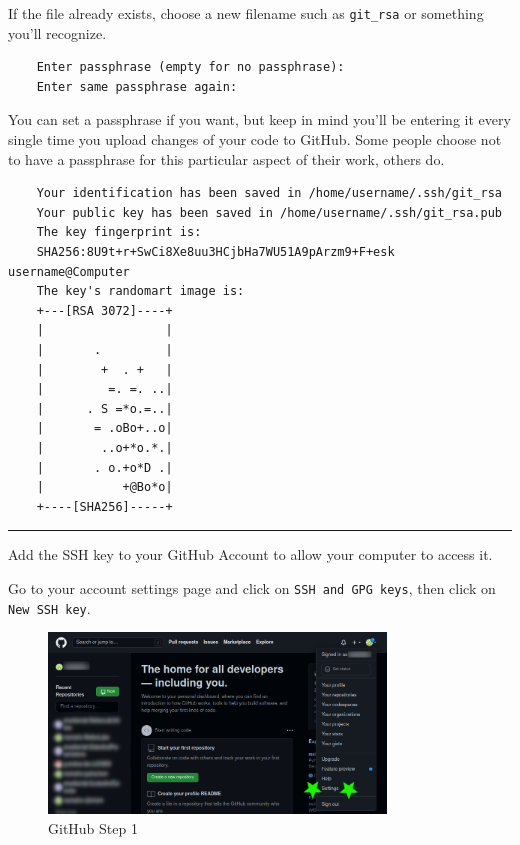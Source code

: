 If the file already exists, choose a new filename such as
\texttt{git\_rsa} or something you'll recognize.

\begin{verbatim}
    Enter passphrase (empty for no passphrase): 
    Enter same passphrase again: 
\end{verbatim}

You can set a passphrase if you want, but keep in mind you'll be
entering it every single time you upload changes of your code to GitHub.
Some people choose not to have a passphrase for this particular aspect
of their work, others do.

\begin{verbatim}
    Your identification has been saved in /home/username/.ssh/git_rsa
    Your public key has been saved in /home/username/.ssh/git_rsa.pub
    The key fingerprint is:
    SHA256:8U9t+r+SwCi8Xe8uu3HCjbHa7WU51A9pArzm9+F+esk username@Computer
    The key's randomart image is:
    +---[RSA 3072]----+
    |                 |
    |       .         |
    |        +  . +   |
    |         =. =. ..|
    |      . S =*o.=..|
    |       = .oBo+..o|
    |        ..o+*o.*.|
    |       . o.+o*D .|
    |           +@Bo*o|
    +----[SHA256]-----+
\end{verbatim}
\begin{center}\rule{0.5\linewidth}{0.5pt}\end{center}
Add the SSH key to your GitHub Account to allow your computer to access
it.

Go to your account settings page and click on
\texttt{SSH\ and\ GPG\ keys}, then click on \texttt{New\ SSH\ key}.

\begin{figure}
\centering
\includegraphics[width=0.8\textwidth]{Images/GH_01.png}
\caption{GitHub Step 1}
\end{figure}
\FloatBarrier

